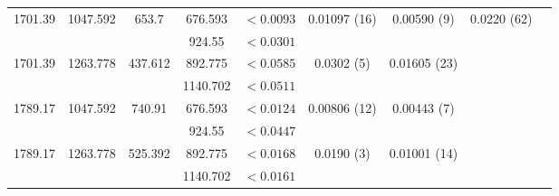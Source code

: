 \begin{landscape}
\begin{longtable}{c|c|c|c|c|c|c|c|c}
        1701.39 & 1047.592 & 653.7 & 676.593 & $<0.0093$ & 0.01097 (16) & 0.00590 (9) & 0.0220 (62)  \\
        &  &  & 924.55 & $<0.0301$ & & & \\ \hline
        1701.39 & 1263.778 & 437.612 & 892.775 & $<0.0585$ & 0.0302 (5) & 0.01605 (23) &   \\
        &  &  & 1140.702 & $<0.0511$ & & &   \\ \hline
        1789.17 & 1047.592 & 740.91 & 676.593 & $<0.0124$ & 0.00806 (12) & 0.00443 (7) & \\
        &  &  & 924.55 & $<0.0447$ & & &  \\ \hline
        1789.17 & 1263.778 & 525.392 & 892.775 & $<0.0168$ & 0.0190 (3) & 0.01001 (14) &  \\
        &  &  & 1140.702 & $<0.0161$ & & &  \\
        \bottomrule
    \end{longtable}
\end{landscape}